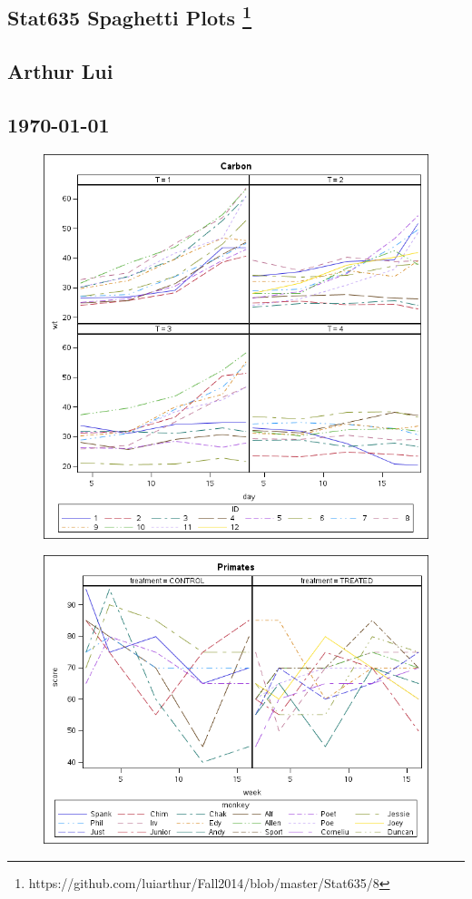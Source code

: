 \documentclass{article}
\def\beginmyfig{\begin{figure}[htbp]\begin{center}}
\def\endmyfig{\end{center}\end{figure}}
\begin{document}
\begin{center}
  \section*{\textbf{Stat635 Spaghetti Plots}
    \footnote{https://github.com/luiarthur/Fall2014/blob/master/Stat635/8}
  }  
  \subsection*{\textbf{Arthur Lui}}
  \subsection*{\noindent\today}
\end{center}

\beginmyfig
  \includegraphics{../SGPanel1.png}
\endmyfig

\beginmyfig
  \includegraphics{../SGPanel.png}
\endmyfig
\end{document}
